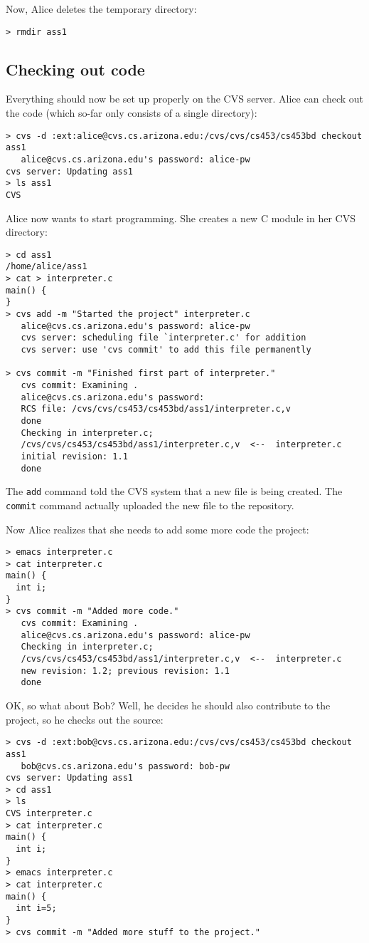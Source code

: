 Now, Alice deletes the temporary directory:
\begin{verbatim}
> rmdir ass1
\end{verbatim}


\subsection{Checking out code}
Everything should now be set up properly on the CVS server.
Alice can check out the code (which so-far only consists of a
single directory):
\begin{verbatim}
> cvs -d :ext:alice@cvs.cs.arizona.edu:/cvs/cvs/cs453/cs453bd checkout ass1
   alice@cvs.cs.arizona.edu's password: alice-pw
cvs server: Updating ass1
> ls ass1
CVS
\end{verbatim}

Alice now wants to start programming. She creates a new C module
in her CVS directory:
\begin{verbatim}
> cd ass1
/home/alice/ass1
> cat > interpreter.c
main() { 
}
> cvs add -m "Started the project" interpreter.c 
   alice@cvs.cs.arizona.edu's password: alice-pw
   cvs server: scheduling file `interpreter.c' for addition
   cvs server: use 'cvs commit' to add this file permanently

> cvs commit -m "Finished first part of interpreter."
   cvs commit: Examining .
   alice@cvs.cs.arizona.edu's password: 
   RCS file: /cvs/cvs/cs453/cs453bd/ass1/interpreter.c,v
   done
   Checking in interpreter.c;
   /cvs/cvs/cs453/cs453bd/ass1/interpreter.c,v  <--  interpreter.c
   initial revision: 1.1
   done
\end{verbatim}

The {\tt add} command told the CVS system that a new file 
is being created. The {\tt commit} command actually uploaded
the new file to the repository.

Now Alice realizes that she needs to add some more code
the project:
\begin{verbatim}
> emacs interpreter.c 
> cat interpreter.c 
main() { 
  int i;
}
> cvs commit -m "Added more code."
   cvs commit: Examining .
   alice@cvs.cs.arizona.edu's password: alice-pw
   Checking in interpreter.c;
   /cvs/cvs/cs453/cs453bd/ass1/interpreter.c,v  <--  interpreter.c
   new revision: 1.2; previous revision: 1.1
   done
\end{verbatim}

OK, so what about Bob? Well, he decides he should also contribute
to the project, so he checks out the source:
\begin{verbatim}
> cvs -d :ext:bob@cvs.cs.arizona.edu:/cvs/cvs/cs453/cs453bd checkout ass1
   bob@cvs.cs.arizona.edu's password: bob-pw
cvs server: Updating ass1
> cd ass1
> ls
CVS interpreter.c
> cat interpreter.c 
main() { 
  int i;
}
> emacs interpreter.c 
> cat interpreter.c 
main() { 
  int i=5;
}
> cvs commit -m "Added more stuff to the project."
\end{verbatim}

